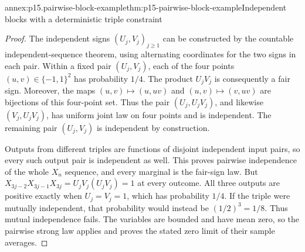 \begin{annexitem}{annex:p15.pairwise-block-example}{thm:p15-pairwise-block-example}{Independent blocks with a deterministic triple constraint}
\begin{proof}
The independent signs \((U_j,V_j)_{j\geq1}\) can be constructed
by the countable independent-sequence theorem, using alternating
coordinates for the two signs in each pair. Within a fixed pair
\((U_j,V_j)\), each of the four points \((u,v)\in\{-1,1\}^2\)
has probability \(1/4\). The product \(U_jV_j\) is consequently
a fair sign. Moreover, the maps
\((u,v)\mapsto(u,uv)\) and \((u,v)\mapsto(v,uv)\) are
bijections of this four-point set. Thus the pair
\((U_j,U_jV_j)\), and likewise \((V_j,U_jV_j)\), has uniform
joint law on four points and is independent. The remaining pair
\((U_j,V_j)\) is independent by construction.

Outputs from different triples are functions of disjoint independent
input pairs, so every such output pair is independent as well.
This proves pairwise independence of the whole \(X_n\) sequence,
and every marginal is the fair-sign law. But
\(X_{3j-2}X_{3j-1}X_{3j}=U_jV_j(U_jV_j)=1\) at every outcome.
All three outputs are positive exactly when \(U_j=V_j=1\),
which has probability \(1/4\). If the triple were mutually
independent, that probability would instead be \((1/2)^3=1/8\).
Thus mutual independence fails. The variables are bounded and have
mean zero, so the pairwise strong law applies and proves the stated
zero limit of their sample averages.
\end{proof}
\end{annexitem}


